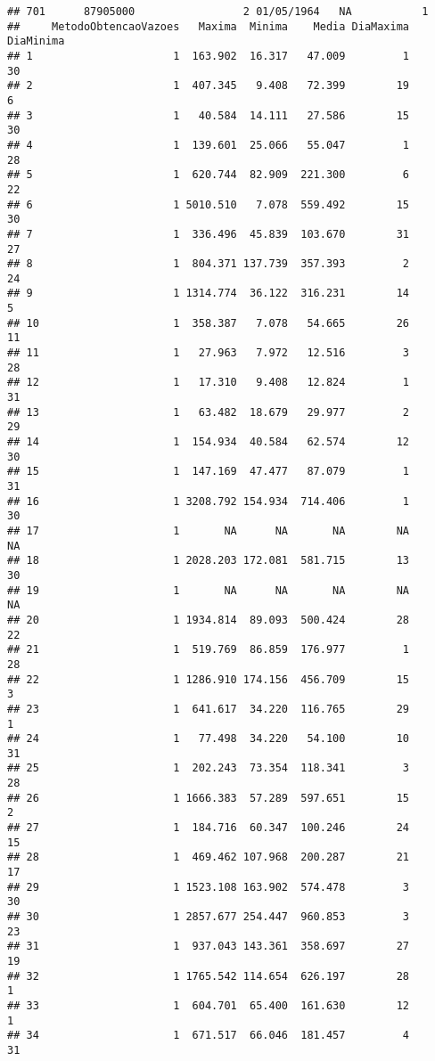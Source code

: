 \documentclass[
]{article}
\begin{document}
\begin{verbatim}
## 701      87905000                 2 01/05/1964   NA           1
##     MetodoObtencaoVazoes   Maxima  Minima    Media DiaMaxima DiaMinima
## 1                      1  163.902  16.317   47.009         1        30
## 2                      1  407.345   9.408   72.399        19         6
## 3                      1   40.584  14.111   27.586        15        30
## 4                      1  139.601  25.066   55.047         1        28
## 5                      1  620.744  82.909  221.300         6        22
## 6                      1 5010.510   7.078  559.492        15        30
## 7                      1  336.496  45.839  103.670        31        27
## 8                      1  804.371 137.739  357.393         2        24
## 9                      1 1314.774  36.122  316.231        14         5
## 10                     1  358.387   7.078   54.665        26        11
## 11                     1   27.963   7.972   12.516         3        28
## 12                     1   17.310   9.408   12.824         1        31
## 13                     1   63.482  18.679   29.977         2        29
## 14                     1  154.934  40.584   62.574        12        30
## 15                     1  147.169  47.477   87.079         1        31
## 16                     1 3208.792 154.934  714.406         1        30
## 17                     1       NA      NA       NA        NA        NA
## 18                     1 2028.203 172.081  581.715        13        30
## 19                     1       NA      NA       NA        NA        NA
## 20                     1 1934.814  89.093  500.424        28        22
## 21                     1  519.769  86.859  176.977         1        28
## 22                     1 1286.910 174.156  456.709        15         3
## 23                     1  641.617  34.220  116.765        29         1
## 24                     1   77.498  34.220   54.100        10        31
## 25                     1  202.243  73.354  118.341         3        28
## 26                     1 1666.383  57.289  597.651        15         2
## 27                     1  184.716  60.347  100.246        24        15
## 28                     1  469.462 107.968  200.287        21        17
## 29                     1 1523.108 163.902  574.478         3        30
## 30                     1 2857.677 254.447  960.853         3        23
## 31                     1  937.043 143.361  358.697        27        19
## 32                     1 1765.542 114.654  626.197        28         1
## 33                     1  604.701  65.400  161.630        12         1
## 34                     1  671.517  66.046  181.457         4        31

\end{verbatim}
\end{document}
